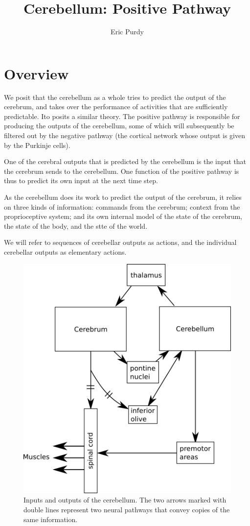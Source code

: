 \documentclass{article}
\title{Cerebellum: Positive Pathway} \author{Eric Purdy}
\theoremstyle{definition}
\begin{document}
\maketitle

\section{Overview}

We posit that the cerebellum as a whole tries to predict the output of
the cerebrum, and takes over the performance of activities that are
sufficiently predictable. Ito \cite{ito} posits a similar theory. The
positive pathway is responsible for producing the outputs of the
cerebellum, some of which will subsequently be filtered out by the
negative pathway (the cortical network whose output is given by the
Purkinje cells).

One of the cerebral outputs that is predicted by the cerebellum is the
input that the cerebrum sends to the cerebellum. One function of the
positive pathway is thus to predict its own input at the next time
step.

As the cerebellum does its work to predict the output of the cerebrum,
it relies on three kinds of information: commands from the cerebrum;
context from the proprioceptive system; and its own internal model of
the state of the cerebrum, the state of the body, and the stte of the
world.

We will refer to sequences of cerebellar outputs as actions, and the
individual cerebellar outputs as elementary actions.

\begin{figure}
\includegraphics[width=\linewidth]{organization.png}
\caption{Inputs and outputs of the cerebellum. The two arrows marked
  with double lines represent two neural pathways that convey copies
  of the same information.}
\label{fig-organization}
\end{figure}
\end{document}
